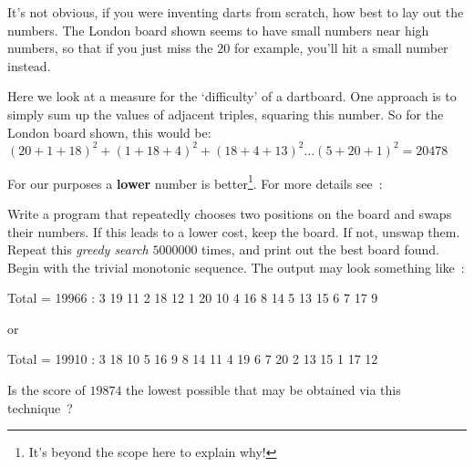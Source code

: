 


It's not obvious, if you were inventing darts from scratch, how best to
lay out the numbers. The London board shown seems to have small numbers near high numbers,
so that if you just miss the $20$ for example, you'll hit a small number instead.

Here we look at a measure for the `difficulty' of a dartboard.
One approach is to simply sum up the values of adjacent triples, squaring 
this number. So for the London board shown, this would be:
\begin{math}
(20+1+18)^2 + (1+18+4)^2 + (18+4+13)^2 \dots (5+20+1)^2 = 20478
\end{math}

For our purposes a {\bf lower} number is better\footnote{It's beyond
the scope here to explain why!}. For more details see~:

\begin{exercise}
Write a program that repeatedly chooses two
positions on the board and swaps their numbers. If this leads to a lower cost,
keep the board. If not, unswap them. Repeat this {\it greedy search}
$5000000$ times, and print out the best board found.
Begin with the trivial monotonic sequence.
The output may look something like~:
\begin{terminaloutput}
Total = 19966 :  3 19 11  2 18 12  1 20 10  4 16  8
14  5 13 15  6  7 17  9 
\end{terminaloutput}
or
\begin{terminaloutput}
Total = 19910 :  3 18 10  5 16  9  8 14 11  4 19  6
7 20  2 13 15  1 17 12 
\end{terminaloutput}

Is the score of $19874$ the lowest possible that may be obtained via this technique~?
\end{exercise}

